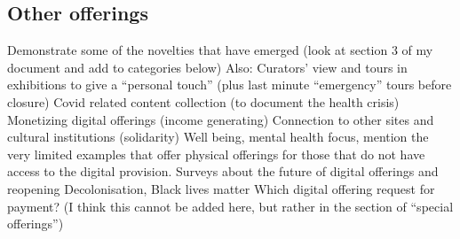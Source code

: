 \documentclass{egpubl}
\begin{document}

















\subsection{Other offerings }
\label{int}

Demonstrate some of the novelties that have emerged (look at section 3 of my document and add to categories below)
Also: 
Curators’ view and tours in exhibitions to give a “personal touch” (plus last minute “emergency” tours before closure)
Covid related content collection (to document the health crisis)
Monetizing digital offerings (income generating)
Connection to other sites and cultural institutions (solidarity)
Well being, mental health focus, mention the very limited examples that offer physical offerings for those  that do not have access to the digital provision.
Surveys about the future of digital offerings and reopening
Decolonisation, Black lives matter
Which digital offering request for payment? (I think this cannot be added here, but rather in the section of “special offerings”)
\end{document}
